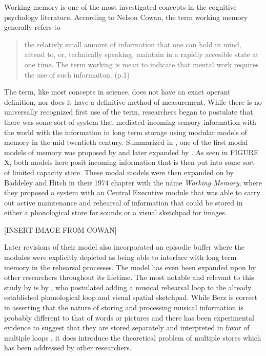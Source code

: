 \documentclass[]{book}
\theoremstyle{definition}
\theoremstyle{definition}
\theoremstyle{definition}
\theoremstyle{remark}
\begin{document}
Working memory is one of the most investigated concepts in the cognitive
psychology literature. According to Nelson Cowan, the term working
memory generally refers to

\begin{quote}
the relativly small amount of information that one can hold in mind,
attend to, or, technically speaking, maintain in a rapidly accesible
state at one time. The term working is mean to indicate that mental work
requires the use of such informaiton. (p.1)
\citep{cowanWorkingMemoryCapacity2005}
\end{quote}

The term, like most concepts in science, does not have an exact operant
definition, nor does it have a definitive method of measurement. While
there is no universally recognized first use of the term, researchers
began to postulate that there was some sort of system that mediated
incoming sensory information with the world with the information in long
term storage using modular models of memory in the mid twentieth
century. Summarized in \citep{cowanWorkingMemoryCapacity2005}, one of
the first modal models of memory was proposed by
\citep{broadbentPerceptionCommunication1958} and later expanded by
\citep{atkinsonHUMANMEMORYPROPOSED1968}. As seen in FIGURE X, both
models here posit incoming information that is then put into some sort
of limited capacity store. These modal models were then expanded on by
Baddeley and Hitch \citep{baddeleyWorkingMemory1974} in their 1974
chapter with the name \emph{Working Memory}, where they proposed a
system with an Central Executive module that was able to carry out
active maintenance and rehearsal of information that could be stored in
either a phonological store for sounds or a visual sketchpad for images.

{[}INSERT IMAGE FROM COWAN{]}

Later revisions of their model also incorporated an episodic buffer
\citep{baddeleyEpisodicBufferNew2000} where the modules were explicitly
depicted as being able to interface with long term memory in the
rehearsal processes. The model has even been expanded upon by other
researchers throughout its lifetime. The most notable and relevant to
this study by is by \citep{berzWorkingMemoryMusic1995}, who postulated
adding a musical rehearsal loop to the already established phonological
loop and visual spatial sketchpad. While Berz is correct in asserting
that the nature of storing and processing musical information is
probably different to that of words or pictures and there has been
experimental evidence to suggest that they are stored separately
\citep{williamsonMusiciansNonmusiciansShortterm2010} and interpreted in
favor of multiple loops \citep{wollnerAttentionalFlexibilityMemory2016}
, it does introduce the theoretical problem of multiple stores which has
been addressed by other researchers.
\end{document}
